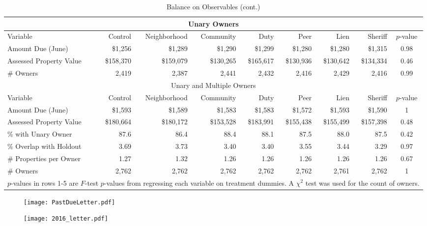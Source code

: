\documentclass[12pt]{article}
\begin{document}
\begin{appendix}
\begin{sidewaystable}[htbp]
\centering
\caption{Balance on Observables (cont.)}\label{balance2}
\bigskip
\begin{tabular}{lrrrrrrrc}
\hline
\multicolumn{9}{c}{Unary Owners} \\
\hline
Variable & Control & Neighborhood & Community & Duty & Peer & Lien & Sheriff & $p$-value \\ 
\hline
Amount Due (June) & \$1,256 & \$1,289 & \$1,290 & \$1,299 & \$1,280 & \$1,280 & \$1,315 & 0.98 \\ 
Assessed Property Value & \$158,370 & \$159,079 & \$130,265 & \$165,617 & \$130,936 & \$130,642 &
 \$134,334 & 0.46 \\ 
\# Owners & 2,419 & 2,387 & 2,441 & 2,432 & 2,416 & 2,429 & 2,416 & 0.99 \\ 
\hline
\multicolumn{9}{c}{Unary and Multiple Owners} \\
\hline
Variable & Control & Neighborhood & Community & Duty & Peer & Lien & Sheriff & $p$-value \\ 
\hline
Amount Due (June) & \$1,593 & \$1,589 & \$1,583 & \$1,583 & \$1,572 & \$1,593 & \$1,590 & 1 \\ 
Assessed Property Value & \$180,664 & \$180,172 & \$153,528 & \$183,991 & \$155,438 & \$155,499 & \$157,398 & 0.48 \\ 
\% with Unary Owner & 87.6 & 86.4 & 88.4 & 88.1 & 87.5 & 88.0 & 87.5 & 0.42 \\ 
\% Overlap with Holdout & 3.69 & 3.73 & 3.40 & 3.40 & 3.55 & 3.44 & 3.29 & 0.97 \\ 
\# Properties per Owner & 1.27 & 1.32 & 1.26 & 1.26 & 1.26 & 1.26 & 1.26 & 0.67 \\ 
\# Owners & 2,762 & 2,762 & 2,762 & 2,762 & 2,762 & 2,761 & 2,762 & 1 \\ 
\hline
\multicolumn{9}{l}{\scriptsize{$p$-values in rows 1-5 are $F$-test
    $p$-values from regressing each variable on treatment dummies. A
    $\chi^2$ test was used for the count of owners.}} \\
\end{tabular}
\end{sidewaystable}


\end{appendix}

\begin{figure}
\begin{center}
\texttt{[image: PastDueLetter.pdf]}
\end{center}
\end{figure}

\begin{figure}
\begin{center}
\texttt{[image: 2016\_letter.pdf]}
\end{center}
\end{figure}
\end{document}
